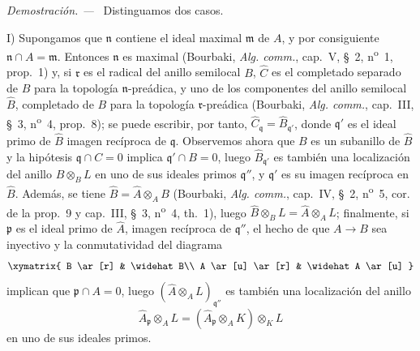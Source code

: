 \documentclass[10pt,oneside]{book}
\newcommand{\oldpage}[2][]{%
  \setcounter{footnote}{0}%
  \marginpar{\scriptsize\textbf{#1}~|~#2}\ignorespaces}
\newenvironment{proof}{%
  \par\medskip\noindent\textit{Demostración. ---\ }}{\par}
\begin{document}
\begin{proof}
Distinguamos dos casos.

I) Supongamos que $\mathfrak n$ contiene el ideal maximal $\mathfrak m$ de
$A$, y por consiguiente $\mathfrak n\cap A=\mathfrak m$. Entonces
$\mathfrak n$ es maximal (Bourbaki, \emph{Alg. comm.}, cap.~V, §~2,
n\textsuperscript{o}~1, prop.~1) y, si $\mathfrak r$ es el radical del anillo
semilocal $B$, $\widehat C$ es el completado separado de $B$ para la topología
$\mathfrak n$-preádica, y uno de los componentes del anillo semilocal
$\widehat B$, completado de $B$ para la topología $\mathfrak r$-preádica
(Bourbaki, \emph{Alg. comm.}, cap.~III, §~3, n\textsuperscript{o}~4,
prop.~8); se puede escribir, por tanto,
$\widehat C_\mathfrak q=\widehat B_{\mathfrak q'}$, donde $\mathfrak q'$ es
el ideal primo de $\widehat B$ imagen recíproca de $\mathfrak q$. Observemos
ahora que $B$ es un subanillo de $\widehat B$ y la hipótesis
$\mathfrak q\cap C=0$ implica $\mathfrak q'\cap B=0$, luego
$\widehat B_{\mathfrak q'}$ es también una localización del anillo
$\widehat B\otimes_B L$ en uno de sus ideales primos $\mathfrak q''$, y
$\mathfrak q'$ es su imagen recíproca en $\widehat B$. Además, se tiene
$\widehat B=\widehat A\otimes_A B$ (Bourbaki, \emph{Alg. comm.}, cap.~IV,
§~2, n\textsuperscript{o}~5, cor. de la prop.~9 y cap.~III, §~3,
n\textsuperscript{o}~4, th.~1), luego
$\widehat B\otimes_B L=\widehat A\otimes_A L$; finalmente, si $\mathfrak p$
es el ideal primo de $\widehat A$, imagen recíproca de $\mathfrak q''$, el
hecho de que $A\to B$ sea inyectivo y la conmutatividad del diagrama
\[
  \xymatrix{
    B \ar[r] & \widehat B\\
    A \ar[u] \ar[r] & \widehat A \ar[u]
  }
\]
implican que $\mathfrak p\cap A=0$, luego
$(\widehat A\otimes_A L)_{\mathfrak q''}$ es también una localización del
anillo
\[
  \widehat A_\mathfrak p\otimes_A L
  =(\widehat A_\mathfrak p\otimes_A K)\otimes_K L
\]
en uno de sus ideales primos.

\oldpage[0\textsubscript{IV-1}]{192}


\end{proof}
\end{document}
